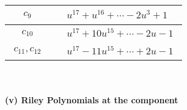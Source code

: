 \documentclass[1p]{elsarticle_modified}
\theoremstyle{definition}
\begin{document}
\begin{tabular}{m{50pt}|m{274pt}}
\hline $$\begin{aligned}c_{9}\end{aligned}$$&$\begin{aligned}
&u^{17}+u^{16}+\cdots-2 u^3+1
\end{aligned}$\\
\hline $$\begin{aligned}c_{10}\end{aligned}$$&$\begin{aligned}
&u^{17}+10 u^{15}+\cdots-2 u-1
\end{aligned}$\\
\hline $$\begin{aligned}c_{11},c_{12}\end{aligned}$$&$\begin{aligned}
&u^{17}-11 u^{15}+\cdots+2 u-1
\end{aligned}$\\
\hline
\end{tabular}\\~\\
\newpage\renewcommand{\arraystretch}{1}
\flushleft \textbf{(v) Riley Polynomials at the component}\newline \\
\end{document}
